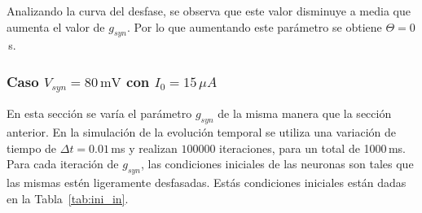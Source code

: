 Analizando la curva del desfase, se observa que este valor disminuye a media que aumenta el valor de $g_{syn}$. Por lo que aumentando este parámetro se obtiene $\Theta=0$\,s. 

\subsubsection{Caso \texorpdfstring{$V_{syn}= 80\,\text{mV}$}{}   con  \texorpdfstring{$I_0 = 15\,\mu A$}{}}



En esta sección se varía el parámetro $g_{syn}$ de la misma manera que la sección anterior. En la simulación de la evolución temporal se utiliza una variación de tiempo de $\Delta t =  0.01\,$ms y realizan $100000$ iteraciones, para un total de 1000\,ms. Para cada iteración de $g_{syn}$, las condiciones iniciales de las neuronas son tales que las mismas estén ligeramente desfasadas. Estás condiciones iniciales están dadas en la Tabla~\ref{tab:ini_in}.

